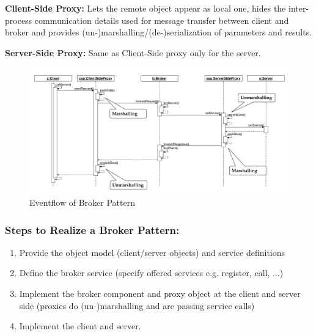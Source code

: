 \textbf{Client-Side Proxy:} Lets the remote object appear as local one, hides the inter-process communication details used for message transfer between client and broker and provides (un-)marshalling/(de-)serialization of parameters and results.
\newline

\textbf{Server-Side Proxy:} Same as Client-Side proxy only for the server.

\begin{figure}[H]
	\centering
	\includegraphics[width=\linewidth]{images/eventflow_broker.png}
	\caption{Eventflow of Broker Pattern}
\end{figure}
\newpage

\subsubsection*{Steps to Realize a Broker Pattern:}
\begin{enumerate}
  \item Provide the object model (client/server objects) and service definitions
  \item Define the broker service (specify offered services e.g. register, call, ...)
  \item Implement the broker component and proxy object at the client and server side (proxies do \hbox{(un-)marshalling} and are passing service calls)
  \item Implement the client and server.
\end{enumerate}
\newpage

